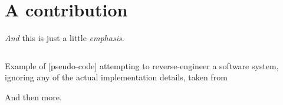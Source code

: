 

\section{A contribution}

\emph{And} this is just a little \emph{emphasis}.

\begin{listing}
    \inputminted[linenos,text=\footnotesize]{python}{test.py}
    \caption[Short version]{Example of [pseudo-code] attempting to reverse-engineer a software system, ignoring any of the actual implementation details, taken from \citep{nielsen_working_2017}}
    \label{code:nielsen_chalktalk}
\end{listing}

And then more.

